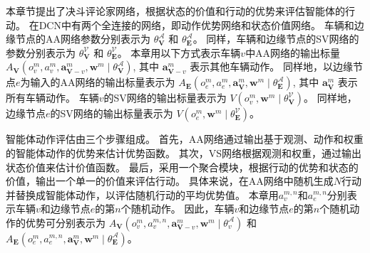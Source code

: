本章节提出了决斗评论家网络，根据状态的价值和行动的优势来评估智能体的行动。
在DCN中有两个全连接的网络，即动作优势网络和状态价值网络。
车辆和边缘节点的AA网络参数分别表示为 $\theta_{\mathbf{V}}^{\mathscr{A}}$ 和 $\theta_{\mathbf{E}}^{\mathscr{A}}$。
同样，车辆和边缘节点的SV网络的参数分别表示为 $\theta_{\mathbf{V}}^{\mathscr{V}}$ 和 $\theta_{\mathbf{E}}^{\mathscr{V}}$。
本章用以下方式表示车辆$v$中AA网络的输出标量 $A_{\mathbf{V}}\left({o}_{v}^{m},  {a}_{v}^{m}, \boldsymbol{a}_{\boldsymbol{\mathbf{V}}-v}^{m}, \boldsymbol{w}^{m} \mid \theta_{\mathbf{V}}^{\mathscr{A}} \right)$, 其中 $\boldsymbol{a}_{\boldsymbol{\mathbf{V}}-v}^{m}$ 表示其他车辆动作。
同样地，以边缘节点$e$为输入的AA网络的输出标量表示为 $A_{\mathbf{E}}\left({o}_{e}^{m},  {a}_{e}^{m}, \boldsymbol{a}_{\boldsymbol{\mathbf{V}}}^{m}, \boldsymbol{w}^{m} \mid \theta_{\mathbf{E}}^{\mathscr{A}} \right)$, 其中 $\boldsymbol{a}_{\boldsymbol{\mathbf{V}}}^{m}$ 表示所有车辆动作。
车辆$v$的SV网络的输出标量表示为 $V\left({o}_{v}^{m}, \boldsymbol{w}^{m} \mid \theta_{\mathbf{V}}^{\mathscr{V}} \right)$。
同样地，边缘节点$e$的SV网络的输出标量表示为 $V\left({o}_{e}^{m}, \boldsymbol{w}^{m} \mid \theta_{\mathbf{E}}^{\mathscr{V}} \right)$。

智能体动作评估由三个步骤组成。
首先，AA网络通过输出基于观测、动作和权重的智能体动作的优势来估计优势函数。
其次，VS网络根据观测和权重，通过输出状态价值来估计价值函数。
最后，采用一个聚合模块，根据行动的优势和状态的价值，输出一个单一的价值来评估行动。
具体来说，在AA网络中随机生成$N$行动并替换成智能体动作，以评估随机行动的平均优势值。
本章用${a}_{v}^{m, n}$和${a}_{e}^{m, n}$分别表示车辆$v$和边缘节点$e$的第$n$个随机动作。
因此，车辆$v$和边缘节点$e$的第$n$个随机动作的优势可分别表示为 $A_{\mathbf{V}}\left({o}_{v}^{m},  {a}_{v}^{m, n}, \boldsymbol{a}_{\boldsymbol{\mathbf{V}}-v}^{m}, \boldsymbol{w}^{m} \mid \theta_{v}^{\mathscr{A}} \right)$ 和 $A_{\mathbf{E}}\left({o}_{e}^{m},  {a}_{e}^{m, n}, \boldsymbol{a}_{\boldsymbol{\mathbf{V}}}^{m}, \boldsymbol{w}^{m} \mid \theta_{\mathbf{E}}^{\mathscr{A}} \right)$。

